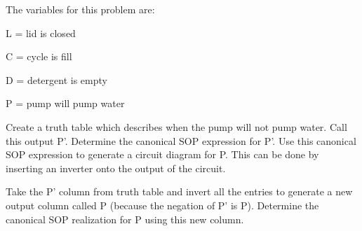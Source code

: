 \begin{enumerate}
The variables for this problem are:
\begin{description}
\item L = lid is closed
\item C = cycle is fill
\item D = detergent is empty
\item P = pump will pump water
\end{description}
                                                                                
                                                                                
Create a truth table which describes when the pump will not
pump water.  Call this output P'.  Determine the canonical SOP
expression for P'.  Use this canonical SOP expression to generate
a circuit diagram for P.  This can be done by inserting an
inverter onto the output of the circuit.
                                                                                
Take the P' column from truth table and invert all the entries
to generate a new output column called P (because
the negation of P' is P).  Determine the canonical SOP
realization for P using this new column.
\end{enumerate}
